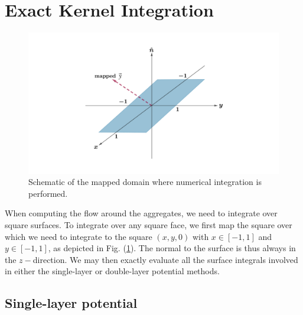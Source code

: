 
\section{Exact Kernel Integration}
\label{appdx}


\begin{figure}[ht]

	\begin{center}
		\includegraphics[scale=0.25]{figures/fig_appendix.pdf}

	\caption{Schematic of the mapped domain where numerical integration is performed.} 

\label{fig_appdx}
\end{center}
\end{figure}

When computing the flow around the aggregates, we need to integrate over square surfaces. 
To integrate over any square face, we first map the square over which we need to integrate to the square $(x,y,0)$ with $x \in [-1,1]$ and $y \in  [-1,1]$, as depicted in Fig. (\ref{fig_appdx}). The normal to the surface is thus always in the $z-$direction. We may then exactly evaluate all the surface integrals involved in either the single-layer or double-layer potential methods. 


\subsection{Single-layer potential}
\label{appdx_single}

